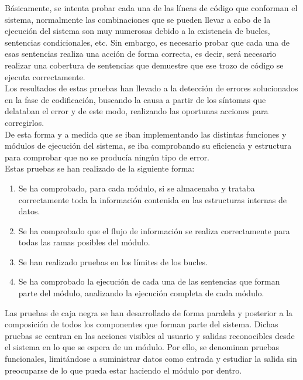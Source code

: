 			Básicamente, se intenta probar cada una de las líneas de código que conforman el sistema, normalmente las combinaciones que se pueden llevar a cabo de la ejecución del sistema son muy numerosas debido a la existencia de bucles, sentencias condicionales, etc. Sin embargo, es necesario probar que cada una de esas sentencias realiza una acción de forma correcta, es decir, será necesario realizar una cobertura de sentencias que demuestre que ese trozo de código se ejecuta correctamente.\\
			
			Los resultados de estas pruebas han llevado a la detección de errores solucionados en la fase de codificación, buscando la causa a partir de los síntomas que delataban el error y de este modo, realizando las oportunas acciones para corregirlos.\\
			
			De esta forma y a medida que se iban implementando las distintas funciones y módulos de ejecución del sistema, se iba comprobando su eficiencia y estructura para comprobar que no se producía ningún tipo de error.\\
			
			Estas pruebas se han realizado de la siguiente forma:
			
			\begin{enumerate}
				\item Se ha comprobado, para cada módulo, si se almacenaba y trataba correctamente toda la información contenida en las estructuras internas de datos.
				\item Se ha comprobado que el flujo de información se realiza correctamente para todas las ramas posibles del módulo.
				\item Se han realizado pruebas en los límites de los bucles.
				\item Se ha comprobado la ejecución de cada una de las sentencias que forman parte del módulo, analizando la ejecución completa de cada módulo.
			\end{enumerate}
			
			Las pruebas de caja negra se han desarrollado de forma paralela y posterior a la composición de todos los componentes que forman parte del sistema. Dichas pruebas se centran en las acciones visibles al usuario y salidas reconocibles desde el sistema en lo que se espera de un módulo. Por ello, se denominan pruebas funcionales, limitándose a suministrar datos como entrada y estudiar la salida sin preocuparse de lo que pueda estar haciendo el módulo por dentro.\\
			
